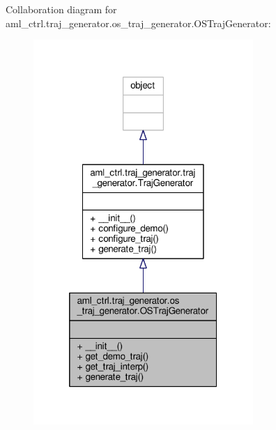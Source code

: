 Collaboration diagram for aml\-\_\-ctrl.\-traj\-\_\-generator.\-os\-\_\-traj\-\_\-generator.\-O\-S\-Traj\-Generator\-:
\nopagebreak
\begin{figure}[H]
\begin{center}
\leavevmode
\includegraphics[width=236pt]{classaml__ctrl_1_1traj__generator_1_1os__traj__generator_1_1_o_s_traj_generator__coll__graph}
\end{center}
\end{figure}

